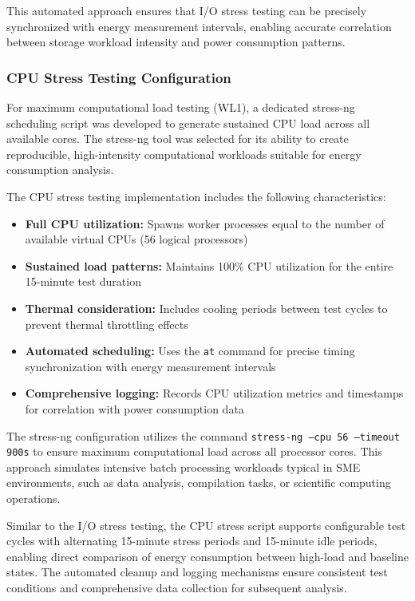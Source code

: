 This automated approach ensures that I/O stress testing can be precisely 
synchronized with energy measurement intervals, enabling accurate correlation 
between storage workload intensity and power consumption patterns.

\subsubsection{CPU Stress Testing Configuration}
\label{methodology:cpu-stress-testing-configuration}
For maximum computational load testing (WL1), a dedicated stress-ng scheduling 
script was developed to generate sustained CPU load across all available cores. 
The stress-ng tool was selected for its ability to create reproducible, 
high-intensity computational workloads suitable for energy consumption analysis.

The CPU stress testing implementation includes the following characteristics:
\begin{itemize}
    \item \textbf{Full CPU utilization:} Spawns worker processes equal to the 
    number of available virtual CPUs (56 logical processors)
    \item \textbf{Sustained load patterns:} Maintains 100\% CPU utilization 
    for the entire 15-minute test duration
    \item \textbf{Thermal consideration:} Includes cooling periods between test 
    cycles to prevent thermal throttling effects
    \item \textbf{Automated scheduling:} Uses the \texttt{at} command for 
    precise timing synchronization with energy measurement intervals
    \item \textbf{Comprehensive logging:} Records CPU utilization metrics and 
    timestamps for correlation with power consumption data
\end{itemize}

The stress-ng configuration utilizes the command 
\texttt{stress-ng --cpu 56 --timeout 900s} to ensure maximum computational 
load across all processor cores. This approach simulates intensive batch 
processing workloads typical in SME environments, such as data analysis, 
compilation tasks, or scientific computing operations.

Similar to the I/O stress testing, the CPU stress script supports configurable 
test cycles with alternating 15-minute stress periods and 15-minute idle 
periods, enabling direct comparison of energy consumption between high-load 
and baseline states. The automated cleanup and logging mechanisms ensure 
consistent test conditions and comprehensive data collection for subsequent 
analysis.

